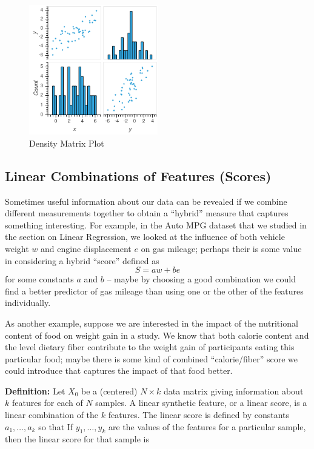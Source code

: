 \documentclass[
  oneside]{scrbook}
\begin{document}
\begin{figure}
\hypertarget{fig:density0}{%
\centering
\includegraphics[width=0.5\textwidth,height=\textheight]{img/density2x2.png}
\caption{Density Matrix Plot}\label{fig:density0}
}
\end{figure}

\hypertarget{linear-combinations-of-features-scores}{%
\subsection{Linear Combinations of Features
(Scores)}\label{linear-combinations-of-features-scores}}

Sometimes useful information about our data can be revealed if we
combine different measurements together to obtain a ``hybrid'' measure
that captures something interesting. For example, in the Auto MPG
dataset that we studied in the section on Linear Regression, we looked
at the influence of both vehicle weight \(w\) and engine displacement
\(e\) on gas mileage; perhaps their is some value in considering a
hybrid ``score'' defined as \[
S = aw + be
\] for some constants \(a\) and \(b\) -- maybe by choosing a good
combination we could find a better predictor of gas mileage than using
one or the other of the features individually.

As another example, suppose we are interested in the impact of the
nutritional content of food on weight gain in a study. We know that both
calorie content and the level dietary fiber contribute to the weight
gain of participants eating this particular food; maybe there is some
kind of combined ``calorie/fiber'' score we could introduce that
captures the impact of that food better.

\textbf{Definition:} Let \(X_{0}\) be a (centered) \(N\times k\) data
matrix giving information about \(k\) features for each of \(N\)
samples. A linear synthetic feature, or a linear score, is a linear
combination of the \(k\) features. The linear score is defined by
constants \(a_{1},\ldots, a_{k}\) so that If \(y_{1},\ldots, y_{k}\) are
the values of the features for a particular sample, then the linear
score for that sample is
\end{document}

